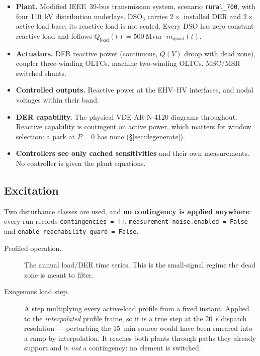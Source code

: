 \documentclass[11pt,a4paper]{article}
\newcommand{\Mvar}{\ensuremath{\mathrm{Mvar}}}
\begin{document}
\begin{itemize}
  \item \textbf{Plant.} Modified IEEE~39-bus transmission system, scenario
    \texttt{rural\_700}, with four \SI{110}{\kilo\volt} distribution underlays.
    $\mathrm{DSO}_3$ carries $2\times$ installed DER and $2\times$ active-load
    base; its reactive load is not scaled. Every DSO has zero constant reactive
    load and follows $Q_\mathrm{load}(t)=\SI{500}{\Mvar}\cdot m_\mathrm{qload}(t)$.
  \item \textbf{Actuators.} DER reactive power (continuous, $Q(V)$ droop with
    dead zone), coupler three-winding OLTCs, machine two-winding OLTCs, MSC/MSR
    switched shunts.
  \item \textbf{Controlled outputs.} Reactive power at the EHV--HV interfaces,
    and nodal voltages within their band.
  \item \textbf{DER capability.} The physical VDE-AR-N-4120 diagrams throughout.
    Reactive capability is contingent on active power, which matters for window
    selection: a park at $P=0$ has none (\S\ref{sec:degenerate}).
  \item \textbf{Controllers see only cached sensitivities} and their own
    measurements. No controller is given the plant equations.
\end{itemize}

\subsection{Excitation}
\label{sec:excitation}

Two disturbance classes are used, and \textbf{no contingency is applied
anywhere}: every run records \texttt{contingencies = []},
\texttt{measurement\_noise.enabled = False} and
\texttt{enable\_reachability\_guard = False}.

\begin{description}
  \item[Profiled operation.] The annual load/DER time series. This is the
    small-signal regime the dead zone is meant to filter.
  \item[Exogenous load step.] A step multiplying every active-load profile from
    a fixed instant. Applied to the \emph{interpolated} profile frame, so it is
    a true step at the \SI{20}{\second} dispatch resolution --- perturbing the
    \SI{15}{\minute} source would have been smeared into a ramp by
    interpolation. It reaches both plants through paths they already support
    and is \emph{not} a contingency: no element is switched.
\end{description}
\end{document}

